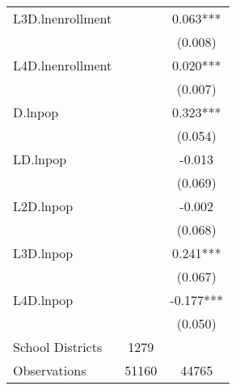 \begin{tabular}{lcc}
L3D.lnenrollment    &  & 0.063*** \\
                    &  & (0.008) \\
L4D.lnenrollment    &  & 0.020*** \\
                    &  & (0.007) \\
D.lnpop             &  & 0.323*** \\
                    &  & (0.054) \\
LD.lnpop            &  & -0.013 \\
                    &  & (0.069) \\
L2D.lnpop           &  & -0.002 \\
                    &  & (0.068) \\
L3D.lnpop           &  & 0.241*** \\
                    &  & (0.067) \\
L4D.lnpop           &  & -0.177*** \\
                    &  & (0.050) \\
\hline
School Districts    & 1279 & \\
Observations        & 51160 & 44765 \\
\hline
\end{tabular}

